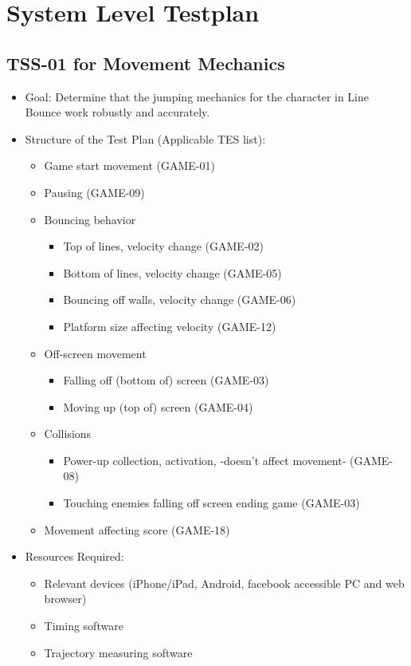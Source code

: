 \chapter{System Level Testplan}
\section{TSS-01 for Movement Mechanics}
\begin{itemize}
\item Goal: Determine that the jumping mechanics for the character in Line Bounce work robustly and accurately.

\item Structure of the Test Plan (Applicable TES list):
\begin{itemize}
\item Game start movement (GAME-01)
\item Pausing (GAME-09)

\item Bouncing behavior
\begin{itemize}
\item Top of lines, velocity change (GAME-02)
\item Bottom of lines, velocity change (GAME-05)
\item Bouncing off walls, velocity change (GAME-06)
\item Platform size affecting velocity (GAME-12)
\end{itemize}

\item Off-screen movement
\begin{itemize}
\item Falling off (bottom of) screen (GAME-03)
\item Moving up (top of) screen (GAME-04)
\end{itemize}

\item Collisions
\begin{itemize}
\item Power-up collection, activation, -doesn\textquoteright{}t affect movement- (GAME-08)
\item Touching enemies falling off screen ending game (GAME-03)
\end{itemize}

\item Movement affecting score (GAME-18)
\end{itemize}

\item Resources Required:
\begin{itemize}
\item Relevant devices (iPhone/iPad, Android, facebook accessible PC and web browser)
\item Timing software
\item Trajectory measuring software
\end{itemize}
\end{itemize}


